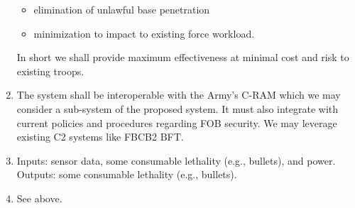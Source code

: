 \documentclass[letterpaper,10pt]{article}
\begin{document}
\begin{enumerate}
\begin{itemize}
\item elimination of unlawful base penetration
\item minimization to impact to existing force workload.
\end{itemize}
In short we shall provide maximum effectiveness at minimal cost and risk to existing troops.
\item
The system shall be interoperable with the Army's C-RAM which we may consider a sub-system of the proposed system.  It must also integrate with current policies and procedures regarding FOB security.  We may leverage existing C2 systems like FBCB2 BFT.
\item
Inputs: sensor data, some consumable lethality (e.g., bullets), and power. \\
Outputs: some consumable lethality (e.g., bullets).
\item
See above.
\end{enumerate}
\end{document}
